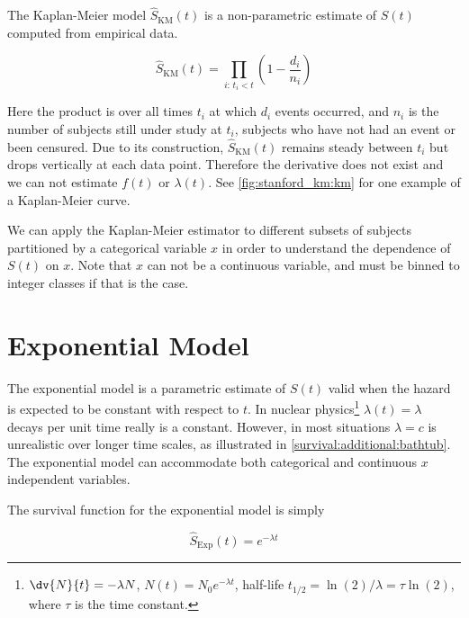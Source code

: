 The Kaplan-Meier model \cite{km} $\hat{S}_{\text{KM}}\left(t\right)$ is a non-parametric
estimate of $S\left(t\right)$ computed from empirical data.

\begin{equation}\label{eq:survival:km}
\hat{S}_{\text{KM}}\left(t\right) = \prod_{i:\,t_{i} < t} \left(1 - \frac{d_{i}}{n_{i}}\right)
\end{equation}

\noindent Here the product is over all times $t_{i}$ at which $d_{i}$ events occurred,
and $n_{i}$ is the number of subjects still under study at $t_{i}$,
\ie subjects who have not had an event or been censured.
Due to its construction, $\hat{S}_{\text{KM}}\left(t\right)$ remains steady
between $t_{i}$ but drops vertically at each data point.
Therefore the derivative does not exist and we can not estimate $f\left(t\right)$ or $\lambda\left(t\right)$.
See \cref{fig:stanford_km:km} for one example of a Kaplan-Meier curve.

We can apply the Kaplan-Meier estimator to different subsets of subjects partitioned by a categorical variable $x$
in order to understand the dependence of $S\left(t\right)$ on $x$.
Note that $x$ can not be a continuous variable, and must be binned to integer classes if that is the case.

\section{Exponential Model}
\label{survival:exp}

The exponential model is a parametric estimate of $S\left(t\right)$
valid when the hazard is expected to be constant with respect to $t$.
In nuclear physics\footnote{$\dv{N}{t} = -\lambda N$, $N\left(t\right) = N_{0} e^{-\lambda t}$,
half-life $t_{1/2} = \ln\left(2\right) / \lambda = \tau \ln\left(2\right)$, where $\tau$ is the time constant.} $\lambda\left(t\right) = \lambda$
decays per unit time really is a constant.
However, in most situations $\lambda = c$ is unrealistic over longer time scales,
as illustrated in \cref{survival:additional:bathtub}.
The exponential model can accommodate both categorical and continuous $x$ independent variables.

The survival function for the exponential model is simply

\begin{equation}\label{eq:survival:exp}
\hat{S}_{\text{Exp}}\left(t\right) = e^{-\lambda t}
\end{equation}

